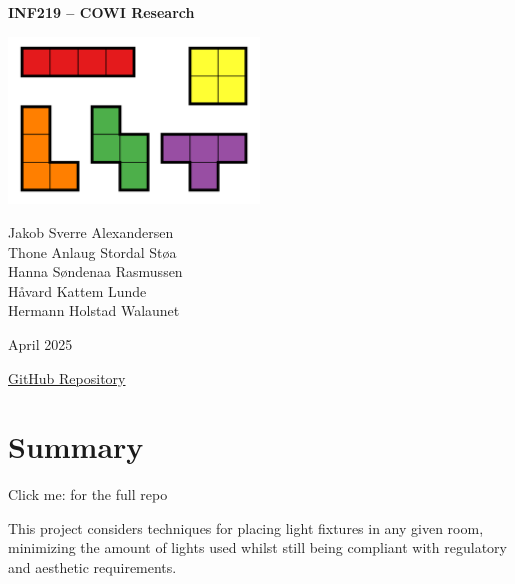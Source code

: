 \documentclass{article}
\begin{document}
\begin{titlepage}
    \centering
    \vspace*{1cm}
    
    
    
    
    
    {\Huge\bfseries INF219 – COWI Research \par}
    
    
    \vspace{1.5cm}
    \includegraphics[width=0.5\textwidth]{tetris.png} %
    \vspace{1cm}

    {\large Jakob Sverre Alexandersen \\
    Thone Anlaug Stordal Støa \\
    Hanna Søndenaa Rasmussen \\
    Håvard Kattem Lunde \\
    Hermann Holstad Walaunet \par}
    
    
    \vfill
    
    {\large April 2025 \par}
    
    \vspace{1cm}
    \href{https://github.com/alexandersen01/COWI-research}{ GitHub Repository}
\end{titlepage}



\section{Summary}

Click me: \href{https://github.com/alexandersen01/COWI-research}{} for the full repo

\hrulefill{}

This project considers techniques for placing light fixtures in any given room, 
minimizing the amount of lights used whilst still being compliant with regulatory
and aesthetic requirements.
\end{document}
